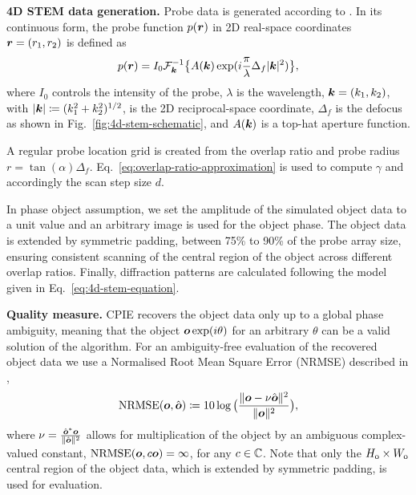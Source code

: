 \documentclass[11pt,draftclsnofoot,onecolumn]{IEEEtran}
\begin{document}
\sqp\noindent \textbf{4D STEM data generation.}
Probe data is generated according to \cite[Eq.~2.4]{hawkes2019springer}. In its continuous form, the probe function $p(\boldsymbol{r})$ in 2D real-space coordinates $\boldsymbol{r} = (r_1, r_2)$ is defined as
\begin{equation}\label{eq:probe-definition}
    p(\boldsymbol r) =I_0 \mathcal F^{-1}_{\boldsymbol k}\big\{A(\boldsymbol k) \exp({i\frac{\pi}{\lambda}\Delta_f |\boldsymbol k|^2})\big\},
\end{equation}
where $I_0$ controls the intensity of the probe, $\lambda$ is the wavelength, $\boldsymbol{k} = (k_1, k_2)$, with $|\boldsymbol{k}| \coloneqq (k_1^2 + k_2^2)^{1/2}$, is the 2D reciprocal-space coordinate, $\Delta_f$ is the defocus as shown in Fig.~\ref{fig:4d-stem-schematic}, and $A(\boldsymbol{k})$ is a top-hat aperture function.

A regular probe location grid is created from the overlap ratio and probe radius $r = \tan(\alpha)\Delta_f$. Eq.~\ref{eq:overlap-ratio-approximation} is used to compute $\gamma$ and accordingly the scan step size $d$.

In phase object assumption, we set the amplitude of the simulated object data to a unit value and an arbitrary image is used for the object phase. The object data is extended by symmetric padding, between 75\% to 90\% of the probe array size, ensuring consistent scanning of the central region of the object across different overlap ratios. Finally, diffraction patterns are calculated following the model given in Eq.~\ref{eq:4d-stem-equation}.

\sqp\noindent \textbf{Quality measure.}
CPIE recovers the object data only up to a global phase ambiguity, meaning that the object $\boldsymbol o\exp(i\theta)$ for an arbitrary $\theta$ can be a valid solution of the algorithm. For an ambiguity-free evaluation of the recovered object data we use a Normalised Root Mean Square Error (NRMSE) described in \cite{maiden2009improved}, \ie
$$
    {\rm NRMSE}(\boldsymbol o, \hat{\boldsymbol o}) \coloneqq 10\log\big(\frac{\|\boldsymbol o - \nu \hat{\boldsymbol o} \|^2}{ \|\boldsymbol o\|^2}\big),
$$
where $\nu = \frac{\hat{\boldsymbol o}^* \boldsymbol o}{\|\hat{\boldsymbol o}\|^2}$ allows for multiplication of the object by an ambiguous complex-valued constant, \ie ${\rm NRMSE}(\boldsymbol o, c\boldsymbol o) = \infty$, for any $c \in \mathbb C$. Note that only the $H_{\rm o}\times W_{\rm o}$ central region of the object data, which is extended by symmetric padding, is used for evaluation.


\end{document}
